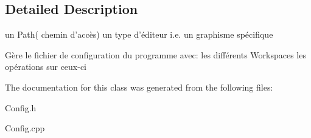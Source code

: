 \subsection{\-Detailed \-Description}
un \-Path( chemin d'accès) un type d'éditeur i.\-e. un graphisme spécifique

\-Gère le fichier de configuration du programme avec\-: les différents \-Workspaces les opérations sur ceux-\/ci 

\-The documentation for this class was generated from the following files\-:\begin{DoxyCompactItemize}
\item 
\-Config.\-h\item 
\-Config.\-cpp\end{DoxyCompactItemize}
